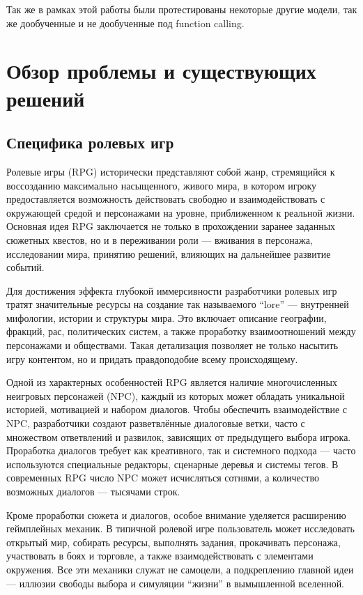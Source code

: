 \documentclass[14pt]{extarticle}
\begin{document}
Так же в рамках этой работы были протестированы некоторые другие модели, так же дообученные и не дообученные под function calling.

\section{Обзор проблемы и существующих решений}

\subsection{Специфика ролевых игр}

Ролевые игры (RPG) исторически представляют собой жанр, стремящийся к воссозданию максимально насыщенного, живого мира, в котором игроку предоставляется возможность действовать свободно и взаимодействовать с окружающей средой и персонажами на уровне, приближенном к реальной жизни. Основная идея RPG заключается не только в прохождении заранее заданных сюжетных квестов, но и в переживании роли — вживания в персонажа, исследовании мира, принятию решений, влияющих на дальнейшее развитие событий.

Для достижения эффекта глубокой иммерсивности разработчики ролевых игр тратят значительные ресурсы на создание так называемого ``lore'' — внутренней мифологии, истории и структуры мира. Это включает описание географии, фракций, рас, политических систем, а также проработку взаимоотношений между персонажами и обществами. Такая детализация позволяет не только насытить игру контентом, но и придать правдоподобие всему происходящему.

Одной из характерных особенностей RPG является наличие многочисленных неигровых персонажей (NPC), каждый из которых может обладать уникальной историей, мотивацией и набором диалогов. Чтобы обеспечить взаимодействие с NPC, разработчики создают разветвлённые диалоговые ветки, часто с множеством ответвлений и развилок, зависящих от предыдущего выбора игрока. Проработка диалогов требует как креативного, так и системного подхода — часто используются специальные редакторы, сценарные деревья и системы тегов. В современных RPG число NPC может исчисляться сотнями, а количество возможных диалогов — тысячами строк.

Кроме проработки сюжета и диалогов, особое внимание уделяется расширению геймплейных механик. В типичной ролевой игре пользователь может исследовать открытый мир, собирать ресурсы, выполнять задания, прокачивать персонажа, участвовать в боях и торговле, а также взаимодействовать с элементами окружения. Все эти механики служат не самоцели, а подкреплению главной идеи — иллюзии свободы выбора и симуляции ``жизни'' в вымышленной вселенной.
\end{document}
